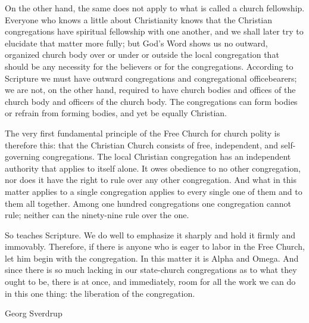 On the other hand, the same does not apply to what is called a church fellowship. Everyone who knows a little about Christianity knows that the Christian congregations have spiritual fellowship with one another, and we shall later try to elucidate that matter more fully; but God’s Word shows us no outward, organized church body over or under or outside the local congregation that should be any necessity for the believers or for the congregations. According to Scripture we must have outward congregations and congregational officebearers; we are not, on the other hand, required to have church bodies and offices of the church body and officers of the church body. The congregations can form bodies or refrain from forming bodies, and yet be equally Christian.

The very first fundamental principle of the Free Church for church polity is therefore this: that the Christian Church consists of free, independent, and self-governing congregations. The local Christian congregation has an independent authority that applies to itself alone. It owes obedience to no other congregation, nor does it have the right to rule over any other congregation. And what in this matter applies to a single congregation applies to every single one of them and to them all together. Among one hundred congregations one congregation cannot rule; neither can the ninety-nine rule over the one.

So teaches Scripture. We do well to emphasize it sharply and hold it firmly and immovably. Therefore, if there is anyone who is eager to labor in the Free Church, let him begin with the congregation. In this matter it is Alpha and Omega. And since there is so much lacking in our state-church congregations as to what they ought to be, there is at once, and immediately, room for all the work we can do in this one thing: the liberation of the congregation.

Georg Sverdrup
